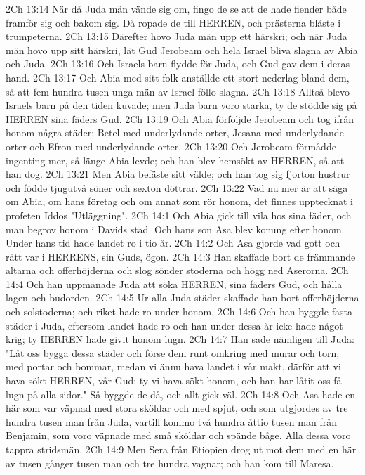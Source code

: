 2Ch 13:14  När då Juda män vände sig om, fingo de se att de hade fiender både framför sig och bakom sig. Då ropade de till HERREN, och prästerna blåste i trumpeterna.
2Ch 13:15  Därefter hovo Juda män upp ett härskri; och när Juda män hovo upp sitt härskri, lät Gud Jerobeam och hela Israel bliva slagna av Abia och Juda.
2Ch 13:16  Och Israels barn flydde för Juda, och Gud gav dem i deras hand.
2Ch 13:17  Och Abia med sitt folk anställde ett stort nederlag bland dem, så att fem hundra tusen unga män av Israel föllo slagna.
2Ch 13:18  Alltså blevo Israels barn på den tiden kuvade; men Juda barn voro starka, ty de stödde sig på HERREN sina fäders Gud.
2Ch 13:19  Och Abia förföljde Jerobeam och tog ifrån honom några städer: Betel med underlydande orter, Jesana med underlydande orter och Efron med underlydande orter.
2Ch 13:20  Och Jerobeam förmådde ingenting mer, så länge Abia levde; och han blev hemsökt av HERREN, så att han dog.
2Ch 13:21  Men Abia befäste sitt välde; och han tog sig fjorton hustrur och födde tjugutvå söner och sexton döttrar.
2Ch 13:22  Vad nu mer är att säga om Abia, om hans företag och om annat som rör honom, det finnes upptecknat i profeten Iddos "Utläggning".
2Ch 14:1  Och Abia gick till vila hos sina fäder, och man begrov honom i Davids stad. Och hans son Asa blev konung efter honom. Under hans tid hade landet ro i tio år.
2Ch 14:2  Och Asa gjorde vad gott och rätt var i HERRENS, sin Guds, ögon.
2Ch 14:3  Han skaffade bort de främmande altarna och offerhöjderna och slog sönder stoderna och högg ned Aserorna.
2Ch 14:4  Och han uppmanade Juda att söka HERREN, sina fäders Gud, och hålla lagen och budorden.
2Ch 14:5  Ur alla Juda städer skaffade han bort offerhöjderna och solstoderna; och riket hade ro under honom.
2Ch 14:6  Och han byggde fasta städer i Juda, eftersom landet hade ro och han under dessa år icke hade något krig; ty HERREN hade givit honom lugn.
2Ch 14:7  Han sade nämligen till Juda: "Låt oss bygga dessa städer och förse dem runt omkring med murar och torn, med portar och bommar, medan vi ännu hava landet i vår makt, därför att vi hava sökt HERREN, vår Gud; ty vi hava sökt honom, och han har låtit oss få lugn på alla sidor." Så byggde de då, och allt gick väl.
2Ch 14:8  Och Asa hade en här som var väpnad med stora sköldar och med spjut, och som utgjordes av tre hundra tusen man från Juda, vartill kommo två hundra åttio tusen man från Benjamin, som voro väpnade med små sköldar och spände båge. Alla dessa voro tappra stridsmän.
2Ch 14:9  Men Sera från Etiopien drog ut mot dem med en här av tusen gånger tusen man och tre hundra vagnar; och han kom till Maresa.
